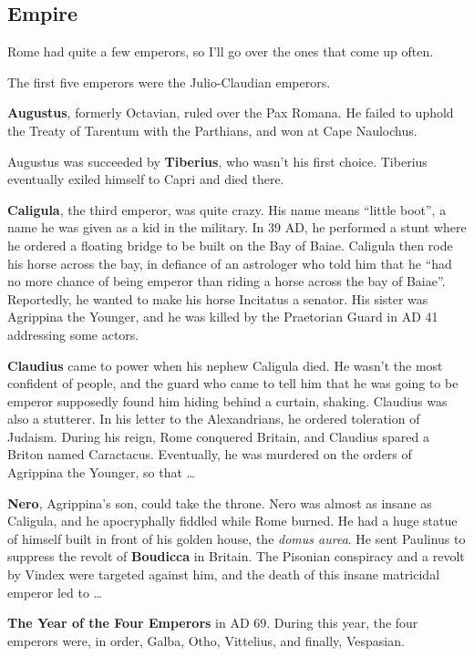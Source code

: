 \subsection*{Empire}

Rome had quite a few emperors, so I'll go over the ones that come up often.

The first five emperors were the Julio-Claudian emperors.

\textbf{Augustus}, formerly Octavian, ruled over the Pax Romana.
He failed to uphold the Treaty of Tarentum with the Parthians, and won at Cape Naulochus.

Augustus was succeeded by \textbf{Tiberius}, who wasn't his first choice.
Tiberius eventually exiled himself to Capri and died there.

\textbf{Caligula}, the third emperor, was quite crazy.
His name means ``little boot'', a name he was given as a kid in the military.
In 39 AD, he performed a stunt where he ordered a floating bridge to be built on the Bay of Baiae.
Caligula then rode his horse across the bay, in defiance of an astrologer who told him that he
``had no more chance of being emperor than riding a horse across the bay of Baiae''.
Reportedly, he wanted to make his horse Incitatus a senator.
His sister was Agrippina the Younger, and he was killed by the Praetorian Guard in AD 41 addressing some actors.

\textbf{Claudius} came to power when his nephew Caligula died.
He wasn't the most confident of people, and the guard who came to tell
him that he was going to be emperor supposedly found him hiding behind a curtain, shaking.
Claudius was also a stutterer.
In his letter to the Alexandrians, he ordered toleration of Judaism.
During his reign, Rome conquered Britain, and Claudius spared a Briton named Caractacus.
Eventually, he was murdered on the orders of Agrippina the Younger, so that \ldots

\textbf{Nero}, Agrippina's son, could take the throne.
Nero was almost as insane as Caligula, and he apocryphally fiddled while Rome burned.
He had a huge statue of himself built in front of his golden house, the \textit{domus aurea}.
He sent Paulinus to suppress the revolt of \textbf{Boudicca} in Britain.
The Pisonian conspiracy and a revolt by Vindex were targeted against him,
and the death of this insane matricidal emperor led to \ldots

\textbf{The Year of the Four Emperors} in AD 69. During this year, the four emperors were, in order,
Galba, Otho, Vittelius, and finally, Vespasian.

